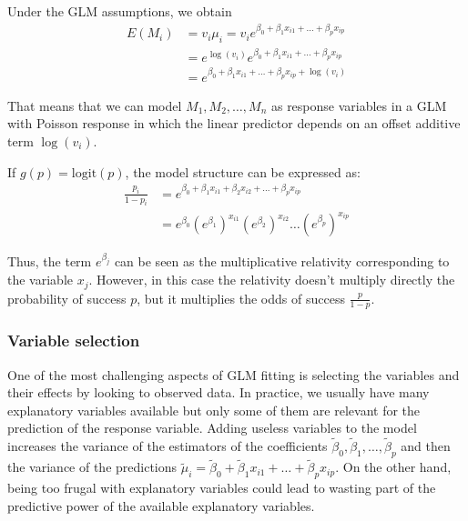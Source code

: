 \documentclass[a4paper, nobind]{templates/ociamthesis}
\theoremstyle{definition}
\theoremstyle{definition}
\theoremstyle{definition}
\theoremstyle{remark}
\begin{document}
Under the GLM assumptions, we obtain
\begin{align*}
E(M_i) & = v_i \mu_i = v_i e^{\beta_0 + \beta_1 x_{i1} + \dots + \beta_p x_{ip}} \\
& = e^{\log(v_i)}e^{\beta_0 + \beta_1 x_{i1} + \dots + \beta_p x_{ip}} \\
& = e^{\beta_0 + \beta_1 x_{i1} + \dots + \beta_p x_{ip} + \log(v_i)}
\end{align*}

That means that we can model \(M_1, M_2, \dots, M_n\) as response variables in a GLM with Poisson response in which the linear predictor depends on an offset additive term \(\log(v_i)\).

If \(g(p) = \text{logit}(p)\), the model structure can be expressed as:
\begin{align*}
\frac{p_i}{1-p_i} & = e^{\beta_0 + \beta_1 x_{i1} + \beta_2 x_{i2} + \dots + \beta_p x_{ip}} \\
& = e^{\beta_0} \left(e^{\beta_1}\right)^{x_{i1}} \left(e^{\beta_2}\right)^{x_{i2}} \dots \left(e^{\beta_p}\right)^{x_{ip}}
\end{align*}

Thus, the term \(e^{\beta_j}\) can be seen as the multiplicative relativity corresponding to the variable \(x_j\). However, in this case the relativity doesn't multiply directly the probability of success \(p\), but it multiplies the odds of success \(\frac{p}{1-p}\).

\hypertarget{chap:variable-selection}{%
\subsubsection{Variable selection}\label{chap:variable-selection}}

One of the most challenging aspects of GLM fitting is selecting the variables and their effects by looking to observed data. In practice, we usually have many explanatory variables available but only some of them are relevant for the prediction of the response variable. Adding useless variables to the model increases the variance of the estimators of the coefficients \(\tilde{\beta}_0, \tilde{\beta}_1, \dots, \tilde{\beta}_p\) and then the variance of the predictions \(\tilde{\mu}_i = \tilde{\beta}_0 + \tilde{\beta}_1 x_{i1} + \dots + \tilde{\beta}_p x_{ip}\). On the other hand, being too frugal with explanatory variables could lead to wasting part of the predictive power of the available explanatory variables.
\end{document}
